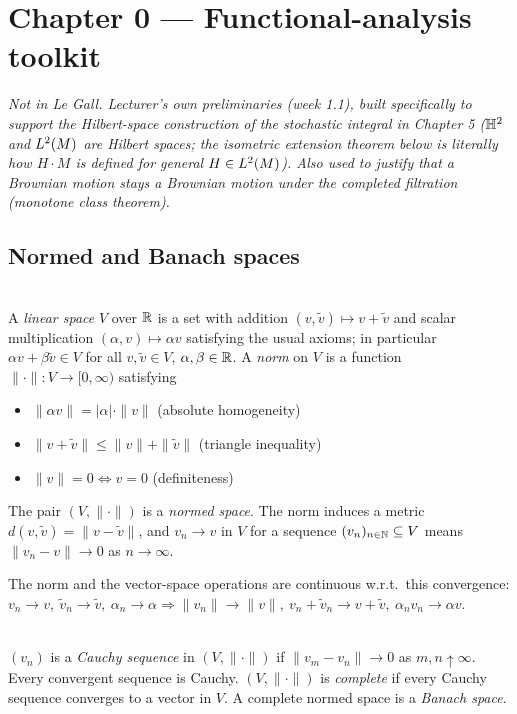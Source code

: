 \section{Chapter 0 --- Functional-analysis toolkit}
\emph{Not in Le Gall. Lecturer's own preliminaries (week 1.1), built specifically to
support the Hilbert-space construction of the stochastic integral in Chapter 5
($\mathbb{H}^2$ and $L^2(M)$ are Hilbert spaces; the isometric extension theorem below is
literally how $H\cdot M$ is defined for general $H\in L^2(M)$). Also used to justify
that a Brownian motion stays a Brownian motion under the completed filtration
(monotone class theorem).}

\subsection{Normed and Banach spaces}
\begin{definition} \label{chap0:definition-normed_space}  \\
A \textit{linear space} $V$ over $\mathbb{R}$ is a set with addition $(v,\tilde v)\mapsto v+\tilde v$ and scalar multiplication $(\alpha,v)\mapsto\alpha v$ satisfying the usual axioms; in particular $\alpha v+\beta\tilde v\in V$ for all $v,\tilde v\in V$, $\alpha,\beta\in\mathbb{R}$. A \textit{norm} on $V$ is a function $\|\cdot\|:V\to[0,\infty)$ satisfying
\begin{itemize}
    \item $\|\alpha v\|=|\alpha|\cdot\|v\|$ (absolute homogeneity)
    \item $\|v+\tilde v\|\le\|v\|+\|\tilde v\|$ (triangle inequality)
    \item $\|v\|=0 \iff v=0$ (definiteness)
\end{itemize}
The pair $(V,\|\cdot\|)$ is a \textit{normed space}. The norm induces a metric $d(v,\tilde v)=\|v-\tilde v\|$, and $v_n\to v$ in $V$ for a sequence $(v_n)_{n \in \mathbb{N}} \subseteq V$ means $\|v_n-v\|\to0$ as $n \to \infty$.
\end{definition}
The norm and the vector-space operations are continuous w.r.t.\ this convergence: $v_n\to v,\ \tilde v_n\to\tilde v,\ \alpha_n\to\alpha \Rightarrow \|v_n\|\to\|v\|,\ v_n+\tilde v_n\to v+\tilde v,\ \alpha_n v_n\to\alpha v$.


\begin{definition} \label{chap0:definition-banach_space}  \\
$(v_n)$ is a \textit{Cauchy sequence} in $(V,\|\cdot\|)$ if $\|v_m-v_n\|\to0$ as $m,n\uparrow\infty$. Every convergent sequence is Cauchy. $(V,\|\cdot\|)$ is \textit{complete} if every Cauchy sequence converges to a vector in $V$. A complete normed space is a \textit{Banach space}.
\end{definition}

